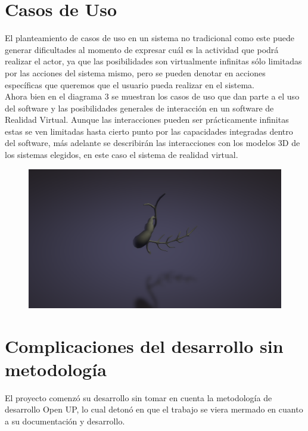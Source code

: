 \section{Casos de Uso}
El planteamiento de casos de uso en un sistema no tradicional como este puede generar dificultades al momento de expresar cuál es la actividad que podrá realizar el actor, ya que las posibilidades son virtualmente infinitas sólo limitadas por las acciones del sistema mismo,  pero se pueden denotar en acciones específicas que queremos que el usuario pueda realizar en el sistema.\\
Ahora bien en el diagrama 3 se muestran los casos de uso que dan parte a el uso del software y las posibilidades generales de interacción en un software de Realidad Virtual. Aunque las interacciones pueden ser prácticamente infinitas estas se ven limitadas hasta cierto punto por las capacidades integradas dentro del software, más adelante se describirán las interacciones con los modelos 3D de los sistemas elegidos, en este caso el sistema de realidad virtual.\\
\begin{figure}[H]
	\begin{center}
 		\includegraphics[width = 1\textwidth]{source/images/image26.png}
	\end{center} 
\end{figure}

\section{Complicaciones del desarrollo sin metodología}
El proyecto comenzó su desarrollo sin tomar en cuenta la metodología de desarrollo Open UP, lo cual detonó en que el trabajo se viera mermado en cuanto a su documentación y desarrollo.\\


